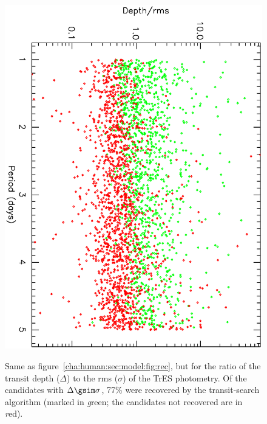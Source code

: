 \begin{figure}
\begin{center}
\centering
\includegraphics[width=.75\textwidth, angle=90]{7_comp_c} \\
\caption[Ratio of $\Delta$ to $\sigma$ versus period for BLS-recovered transits]{%
Same as figure~\ref{cha:human:sec:model:fig:rec}, but for the ratio of the transit depth ($\Delta$) to the rms ($\sigma$) of the TrES photometry.
Of the candidates with $\Delta\gsim\sigma$, 77\% were recovered by the transit-search algorithm (marked in {\textit green}; the candidates not recovered are in {\textit red}).%
}\label{cha:human:sec:model:fig:ratiorec}
\end{center}
\end{figure}

